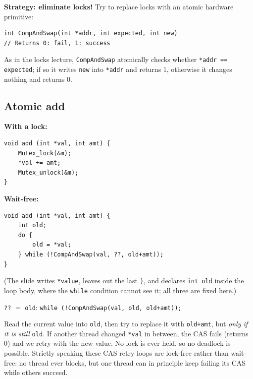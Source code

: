 \documentclass[11pt,a4paper]{article}
\begin{document}
\textbf{Strategy: eliminate locks!} Try to replace locks with an atomic
hardware primitive:

\begin{lstlisting}[numbers=none]
int CompAndSwap(int *addr, int expected, int new)
// Returns 0: fail, 1: success
\end{lstlisting}
As in the locks lecture, \texttt{CompAndSwap} atomically checks whether
\texttt{*addr == expected}; if so it writes \texttt{new} into \texttt{*addr}
and returns 1, otherwise it changes nothing and returns 0.

\subsection{Atomic add}

\begin{center}
\begin{minipage}[t]{0.4\textwidth}
\textbf{With a lock:}
\begin{lstlisting}[numbers=none]
void add (int *val, int amt) {
    Mutex_lock(&m);
    *val += amt;
    Mutex_unlock(&m);
}
\end{lstlisting}
\end{minipage}\hfill
\begin{minipage}[t]{0.54\textwidth}
\textbf{Wait-free:}
\begin{lstlisting}[numbers=none]
void add (int *val, int amt) {
    int old;
    do {
        old = *val;
    } while (!CompAndSwap(val, ??, old+amt));
}
\end{lstlisting}
\end{minipage}
\end{center}
{\small (The slide writes \texttt{*value}, leaves out the last \texttt{)}, and
declares \texttt{int old} inside the loop body, where the \texttt{while}
condition cannot see it; all three are fixed here.)}

\begin{quizbox}
\texttt{??} \(=\) \texttt{old}:
\texttt{while (!CompAndSwap(val, old, old+amt));}

Read the current value into \texttt{old}, then try to replace it with
\texttt{old+amt}, but \emph{only if it is still} \texttt{old}. If another
thread changed \texttt{*val} in between, the CAS fails (returns 0) and we
retry with the new value. No lock is ever held, so no deadlock is possible.
Strictly speaking these CAS retry loops are lock-free rather than wait-free:
no thread ever blocks, but one thread can in principle keep failing its CAS
while others succeed.
\end{quizbox}
\end{document}
